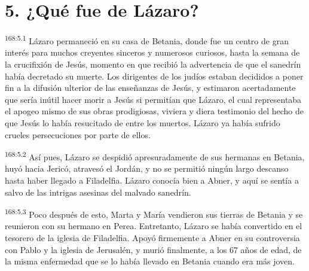 \section*{5. ¿Qué fue de Lázaro?}
\par 
\textsuperscript{168:5.1} Lázaro permaneció en su casa de Betania, donde fue un centro de gran interés para muchos creyentes sinceros y numerosos curiosos, hasta la semana de la crucifixión de Jesús, momento en que recibió la advertencia de que el sanedrín había decretado su muerte. Los dirigentes de los judíos estaban decididos a poner fin a la difusión ulterior de las enseñanzas de Jesús, y estimaron acertadamente que sería inútil hacer morir a Jesús si permitían que Lázaro, el cual representaba el apogeo mismo de sus obras prodigiosas, viviera y diera testimonio del hecho de que Jesús lo había resucitado de entre los muertos. Lázaro ya había sufrido crueles persecuciones por parte de ellos.

\par 
\textsuperscript{168:5.2} Así pues, Lázaro se despidió apresuradamente de sus hermanas en Betania, huyó hacia Jericó, atravesó el Jordán, y no se permitió ningún largo descanso hasta haber llegado a Filadelfia. Lázaro conocía bien a Abner, y aquí se sentía a salvo de las intrigas asesinas del malvado sanedrín.

\par 
\textsuperscript{168:5.3} Poco después de esto, Marta y María vendieron sus tierras de Betania y se reunieron con su hermano en Perea. Entretanto, Lázaro se había convertido en el tesorero de la iglesia de Filadelfia. Apoyó firmemente a Abner en su controversia con Pablo y la iglesia de Jerusalén, y murió finalmente, a los 67 años de edad, de la misma enfermedad que se lo había llevado en Betania cuando era más joven.